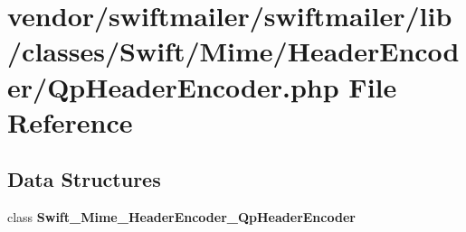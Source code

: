 \section{vendor/swiftmailer/swiftmailer/lib/classes/\+Swift/\+Mime/\+Header\+Encoder/\+Qp\+Header\+Encoder.php File Reference}
\label{_qp_header_encoder_8php}
\subsection*{Data Structures}
\begin{DoxyCompactItemize}
\item 
class {\bf Swift\+\_\+\+Mime\+\_\+\+Header\+Encoder\+\_\+\+Qp\+Header\+Encoder}
\end{DoxyCompactItemize}
